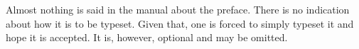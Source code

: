 \begin{preface}
    Almost nothing is said in the manual about the preface. There is no
    indication about how it is to be typeset. Given that, one is forced to
    simply typeset it and hope it is accepted. It is, however, optional
    and may be omitted.
\end{preface}